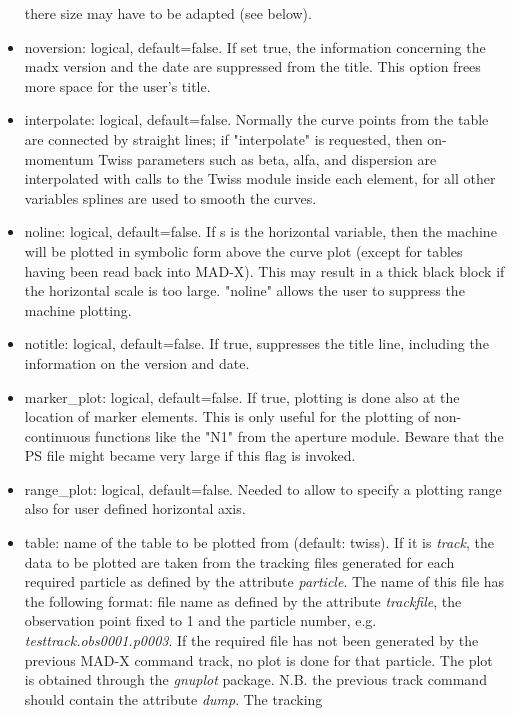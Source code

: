 \begin{itemize}
     there size may have to be adapted (see below).   
   \item noversion: logical, default=false. If set true, the information
     concerning the madx version and the date are suppressed from the
     title. This option frees more space for the user's title.   
   \item interpolate: logical, default=false. Normally the curve points
     from the table are connected by straight lines; if "interpolate" is
     requested, then on-momentum Twiss parameters such as beta, alfa,
     and dispersion are interpolated with calls to the Twiss module
     inside each element, for all other variables splines are used to
     smooth the curves.   
   \item noline: logical, default=false. If s is the horizontal
     variable, then the machine will be plotted in symbolic form above
     the curve plot (except for tables having been read back into
     MAD-X). This may result in a thick black block if the horizontal
     scale is too large. "noline" allows the user to suppress the
     machine plotting.    
   \item notitle: logical, default=false. If true, suppresses the title
     line, including the information on the version and date.  
   \item marker\_plot: logical, default=false. If true, plotting is done
     also at the location of marker elements. This is only useful for
     the plotting of non-continuous functions like the "N1" from the
     aperture module. Beware that the PS file might became very large if
     this flag is invoked.  
   \item range\_plot: logical, default=false. Needed to allow to specify
     a plotting range also for user defined horizontal axis.   
   \item table: name of the table to be plotted from (default:
     twiss). If it is \textit{track}, the data to be plotted are taken
     from the tracking files generated for each required particle as
     defined by the attribute \textit{particle}. The name of this file
     has the following format: file name as defined by the attribute
     \textit{trackfile}, the observation point fixed to 1 and the
     particle number, e.g. \textit{testtrack.obs0001.p0003}.  If the
     required file has not been generated by the previous MAD-X command
     track, no plot is done for that particle.  The plot is obtained
     through the \textit{gnuplot} package.  N.B. the previous track
     command should contain the attribute \textit{dump}. The tracking

\end{itemize}
